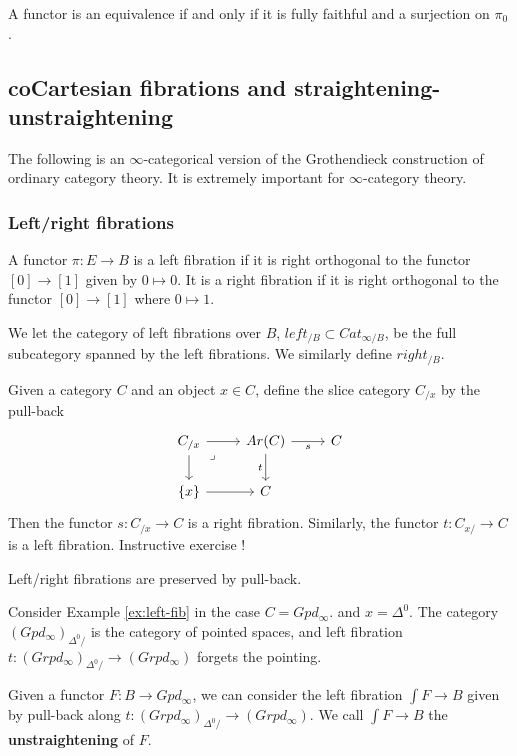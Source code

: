 \begin{prop}
    A functor is an equivalence if and only if it is fully faithful and a surjection on $\pi_0$.
\end{prop}

\subsection{coCartesian fibrations and straightening-unstraightening}
The following is an $\infty$-categorical version of the Grothendieck construction of ordinary category theory. It is extremely important for $\infty$-category theory.

\subsubsection{Left/right fibrations}

\begin{definition}
    A functor $\pi:E\rightarrow B$ is a left fibration if it is right orthogonal to the functor $[0]\rightarrow [1]$ given by $0\mapsto 0$. It is a right fibration if it is right orthogonal to the functor $[0]\rightarrow [1]$ where $0\mapsto 1.$

    We let the category of left fibrations over $B$, $left_{/B}\subset Cat_{\infty/B}$, be the full subcategory spanned by the left fibrations. We similarly define $right_{/B}$.
\end{definition}

\begin{example}\label{ex:left-fib}
    Given a category $C$ and an object $x\in C$, define the slice category $C_{/x}$ by the pull-back 
\[\begin{tikzcd}
	{C_{/x}} & {Ar(C)} & C \\
	{\{x\}} & C
	\arrow[from=1-1, to=1-2]
	\arrow[from=1-1, to=2-1]
	\arrow["\lrcorner"{anchor=center, pos=0.125}, draw=none, from=1-1, to=2-2]
	\arrow["s"', from=1-2, to=1-3]
	\arrow["t"', from=1-2, to=2-2]
	\arrow[from=2-1, to=2-2]
\end{tikzcd}\]
Then the functor $s:C_{/x}\rightarrow C$ is a right fibration. Similarly, the functor $t:C_{x/}\rightarrow C$ is a left fibration. Instructive exercise !
\end{example}

\begin{prop}
    Left/right fibrations are preserved by pull-back.
\end{prop}

\begin{example}
    Consider Example \ref{ex:left-fib} in the case $C=Gpd_{\infty}$. and $x=\Delta^0$. The category $(Gpd_{\infty})_{\Delta^0/}$ is the category of pointed spaces, and left fibration $t:(Grpd_\infty)_{\Delta^0/}\rightarrow (Grpd_\infty)$ forgets the pointing.

    Given a functor $F:B\rightarrow Gpd_\infty$, we can consider the left fibration $\int F\rightarrow B$ given by pull-back along $t:(Grpd_\infty)_{\Delta^0/}\rightarrow (Grpd_\infty)$. We call $\int F\rightarrow B$ the \textbf{unstraightening} of $F$.
\end{example}


